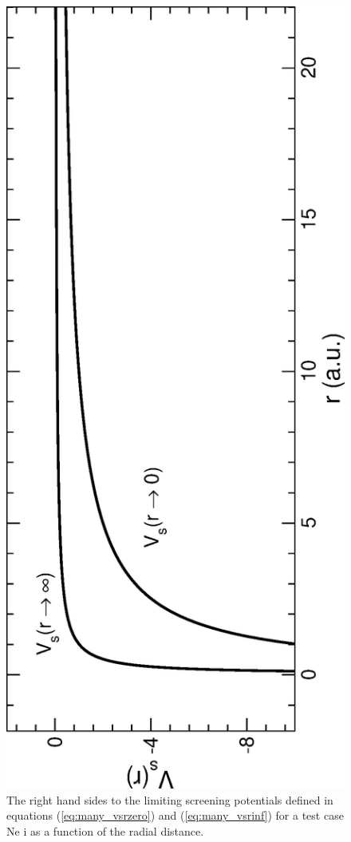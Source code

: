 \begin{figure}
\includegraphics[scale=0.555,angle=-90]{Figures/many_electron/vscreen.eps}
\caption{The right hand sides to the limiting screening potentials defined in equations (\ref{eq:many_vsrzero}) and (\ref{eq:many_vsrinf}) for a test case Ne {\sc i} as a function of the radial distance.  \label{fig:many_vs}}
\end{figure}

